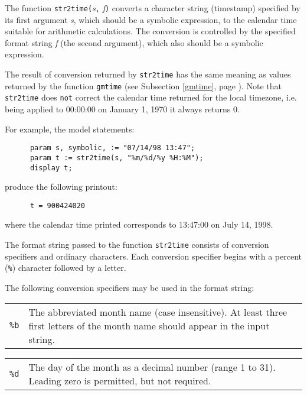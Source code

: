\documentclass[11pt]{report}
\begin{document}
The function {\tt str2time(}{\it s}{\tt,} {\it f}{\tt)} converts a
character string (timestamp) specified by its first argument {\it s},
which should be a symbolic expression, to the calendar time suitable
for arithmetic calculations. The conversion is controlled by the
specified format string {\it f} (the second argument), which also
should be a symbolic expression.

\newpage

The result of conversion returned by {\tt str2time} has the same
meaning as values returned by the function {\tt gmtime} (see Subsection
\ref{gmtime}, page \pageref{gmtime}). Note that {\tt str2time} does
{\tt not} correct the calendar time returned for the local timezone,
i.e. being applied to 00:00:00 on January 1, 1970 it always returns 0.

For example, the model statements:

\begin{verbatim}
      param s, symbolic, := "07/14/98 13:47";
      param t := str2time(s, "%m/%d/%y %H:%M");
      display t;
\end{verbatim}

\noindent produce the following printout:

\begin{verbatim}
      t = 900424020
\end{verbatim}

\noindent where the calendar time printed corresponds to 13:47:00 on
July 14, 1998.

The format string passed to the function {\tt str2time} consists of
conversion specifiers and ordinary characters. Each conversion
specifier begins with a percent ({\tt\%}) character followed by a
letter.

The following conversion specifiers may be used in the format string:

\begin{tabular}{@{}p{20pt}p{421.5pt}@{}}
{\tt\%b}&The abbreviated month name (case insensitive). At least three
first letters of the month name should appear in the input string.\\
\end{tabular}

\begin{tabular}{@{}p{20pt}p{421.5pt}@{}}
{\tt\%d}&The day of the month as a decimal number (range 1 to 31).
Leading zero is permitted, but not required.\\
\end{tabular}
\end{document}
